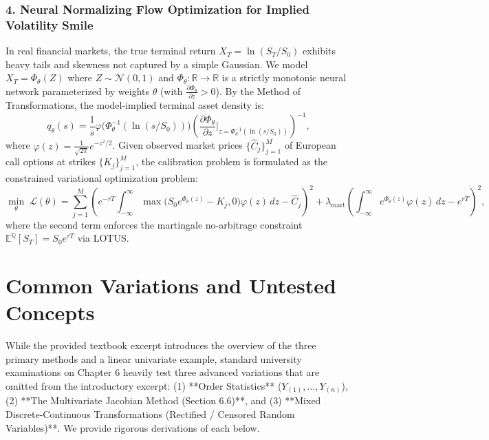 \documentclass[11pt, letterpaper]{article}
\theoremstyle{definition}
\theoremstyle{remark}
\newcommand{\R}{\mathbb{R}}
\newcommand{\E}{\mathbb{E}}
\begin{document}
\begin{itemize}
\subsubsection*{4. Neural Normalizing Flow Optimization for Implied Volatility Smile}
In real financial markets, the true terminal return $X_T = \ln(S_T / S_0)$ exhibits heavy tails and skewness not captured by a simple Gaussian. We model $X_T = \Phi_\theta(Z)$ where $Z \sim \mathcal{N}(0, 1)$ and $\Phi_\theta: \R \to \R$ is a strictly monotonic neural network parameterized by weights $\theta$ (with $\frac{\partial \Phi_\theta}{\partial z} > 0$). By the Method of Transformations, the model-implied terminal asset density is:
\[
    q_\theta(s) = \frac{1}{s} \varphi\big(\Phi_\theta^{-1}(\ln(s / S_0))\big) \left( \frac{\partial \Phi_\theta}{\partial z}\Big|_{z = \Phi_\theta^{-1}(\ln(s/S_0))} \right)^{-1},
\]
where $\varphi(z) = \frac{1}{\sqrt{2\pi}}e^{-z^2/2}$. Given observed market prices $\{\hat{C}_j\}_{j=1}^M$ of European call options at strikes $\{K_j\}_{j=1}^M$, the calibration problem is formulated as the constrained variational optimization problem:
\[
    \min_{\theta} \; \mathcal{L}(\theta) = \sum_{j=1}^M \left( e^{-rT} \int_{-\infty}^{\infty} \max\big(S_0 e^{\Phi_\theta(z)} - K_j, 0\big) \varphi(z) \, dz - \hat{C}_j \right)^2 + \lambda_{\text{mart}} \left( \int_{-\infty}^{\infty} e^{\Phi_\theta(z)} \varphi(z) \, dz - e^{rT} \right)^2,
\]
where the second term enforces the martingale no-arbitrage constraint $\E^{\mathbb{Q}}[S_T] = S_0 e^{rT}$ via LOTUS.

\newpage
\section{Common Variations and Untested Concepts}

While the provided textbook excerpt introduces the overview of the three primary methods and a linear univariate example, standard university examinations on Chapter 6 heavily test three advanced variations that are omitted from the introductory excerpt: (1) **Order Statistics** ($Y_{(1)}, \dots, Y_{(n)}$), (2) **The Multivariate Jacobian Method (Section 6.6)**, and (3) **Mixed Discrete-Continuous Transformations (Rectified / Censored Random Variables)**. We provide rigorous derivations of each below.


\end{itemize}
\end{document}
